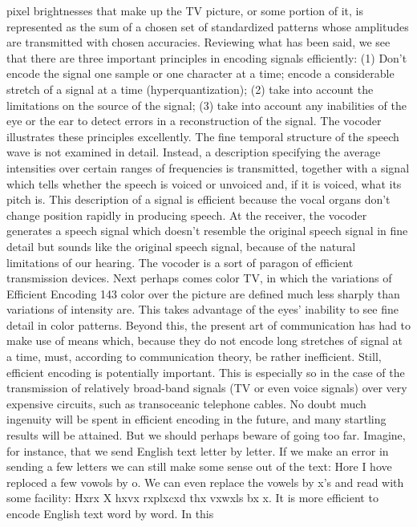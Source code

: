 {{{pixel brightnesses that make up the TV picture, or some portion of
it, is represented as the sum of a chosen set of standardized patterns
whose amplitudes are transmitted with chosen accuracies.
Reviewing what has been said, we see that there are three important
principles in encoding signals efficiently: (1) Don’t encode
the signal one sample or one character at a time; encode a considerable
stretch of a signal at a time (hyperquantization); (2) take
into account the limitations on the source of the signal; (3) take
into account any inabilities of the eye or the ear to detect errors
in a reconstruction of the signal.
The vocoder illustrates these principles excellently. The fine
temporal structure of the speech wave is not examined in detail.
Instead, a description specifying the average intensities over certain
ranges of frequencies is transmitted, together with a signal which
tells whether the speech is voiced or unvoiced and, if it is voiced,
what its pitch is. This description of a signal is efficient because the
vocal organs don’t change position rapidly in producing speech.
At the receiver, the vocoder generates a speech signal which doesn’t
resemble the original speech signal in fine detail but sounds like
the original speech signal, because of the natural limitations of
our hearing.
The vocoder is a sort of paragon of efficient transmission
devices. Next perhaps comes color TV, in which the variations of
Efficient Encoding 143
color over the picture are defined much less sharply than variations
of intensity are. This takes advantage of the eyes’ inability to see
fine detail in color patterns.
Beyond this, the present art of communication has had to make
use of means which, because they do not encode long stretches of
signal at a time, must, according to communication theory, be
rather inefficient.
Still, efficient encoding is potentially important. This is especially
so in the case of the transmission of relatively broad-band signals
(TV or even voice signals) over very expensive circuits, such as
transoceanic telephone cables.
No doubt much ingenuity will be spent in efficient encoding in
the future, and many startling results will be attained. But we
should perhaps beware of going too far.
Imagine, for instance, that we send English text letter by letter.
If we make an error in sending a few letters we can still make some
sense out of the text:
Hore I hove reploced a few vowols by o.
We can even replace the vowels by x’s and read with some
facility:
Hxrx X hxvx rxplxcxd thx vxwxls bx x.
It is more efficient to encode English text word by word. In this
}}}
